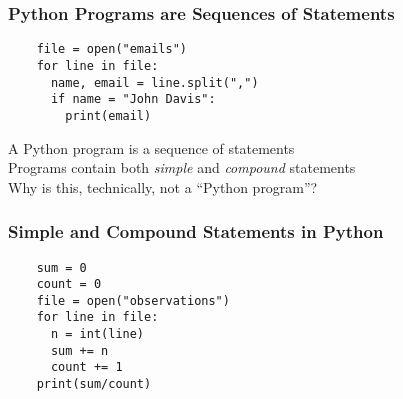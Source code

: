 \documentclass[14pt,aspectratio=169]{beamer}
\begin{document}
%
\begin{frame}[fragile]
  \frametitle{Python Programs are Sequences of Statements}
  \normalsize
  \hspace*{-.65in}
  \begin{minipage}{6in}
    \vspace*{.25in}
    \begin{verbatim}
    file = open("emails")
    for line in file:
      name, email = line.split(",")
      if name = "John Davis":
        print(email)
    \end{verbatim}
  \end{minipage}
  \vspace*{.25in}
  \begin{center}
    \normalsize \noindent A Python program is a sequence of statements \\
    \normalsize \noindent Programs contain both {\em simple} and {\em compound} statements \\
    \normalsize \noindent Why is this, technically, not a ``Python program''? \\
  \end{center}
\end{frame}

%
\begin{frame}[fragile]
  \frametitle{Simple and Compound Statements in Python}
  \hspace*{-.6in}
  \begin{minipage}{6in}
    \begin{verbatim}
    sum = 0
    count = 0
    file = open("observations")
    for line in file:
      n = int(line)
      sum += n
      count += 1
    print(sum/count)
    \end{verbatim}
  \end{minipage}
\end{frame}
\end{document}
